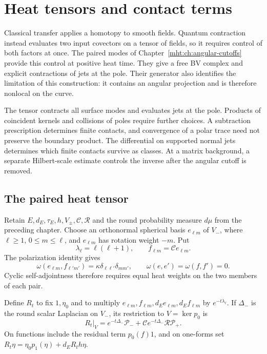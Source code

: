 \chapter{Heat tensors and contact terms}
\label{mht:ch:heat-contacts}

Classical transfer applies a homotopy to smooth fields. Quantum
contraction instead evaluates two input covectors on a tensor of
fields, so it requires control of both factors at once. The paired
modes of Chapter~\ref{mht:ch:angular-cutoffs} provide this control at
positive heat time. They give a free BV complex and explicit
contractions of jets at the pole. Their generator also identifies
the limitation of this construction: it contains an angular
projection and is therefore nonlocal on the curve.

The tensor contracts all surface modes and evaluates jets at the
pole. Products of coincident kernels and collisions of poles
require further choices. A subtraction prescription determines
finite contacts, and convergence of a polar trace need not
preserve the boundary product.
The differential on supported normal jets determines which finite
contacts survive as classes. At a matrix background, a separate
Hilbert-scale estimate controls the inverse after the angular cutoff
is removed.

\section{The paired heat tensor}

Retain $E,d_E,\tau_E,h,V_\pm,\mathcal C,\mathcal R$ and the round
probability measure $d\mu$ from the preceding chapter. Choose an
orthonormal spherical basis $e_{\ell m}$ of $V_-$, where
$\ell\geq1$, $0\leq m\leq\ell$, and $e_{\ell m}$ has rotation
weight $-m$. Put
\[
 \lambda_\ell=\ell(\ell+1),\qquad
 f_{\ell m}=\mathcal Ce_{\ell m}.
\]
The polarization identity gives
\[
 \omega(e_{\ell m},f_{\ell'm'})
   =\kappa\delta_{\ell\ell'}\delta_{mm'},\qquad
 \omega(e,e')=\omega(f,f')=0.
\]
Cyclic self-adjointness therefore requires equal heat weights
on the two members of each pair.

Define $R_t$ to fix $1,\eta_0$ and to multiply
$e_{\ell m},f_{\ell m},d_Ee_{\ell m},d_Ef_{\ell m}$ by
$e^{-t\lambda_\ell}$. If $\Delta_-$ is the round scalar Laplacian
on $V_-$, its restriction to $V=\ker p_0$ is
\begin{equation}\label{mht:eq:paired-heat-operator}
 R_t|_V=e^{-t\Delta_-}\mathcal P_-
       +\mathcal Ce^{-t\Delta_-}\mathcal R\mathcal P_+.
\end{equation}
On functions include the residual term $p_0(f)1$, and on one-forms
set $R_t\eta=\eta_0p_1(\eta)+d_ER_th\eta$.

